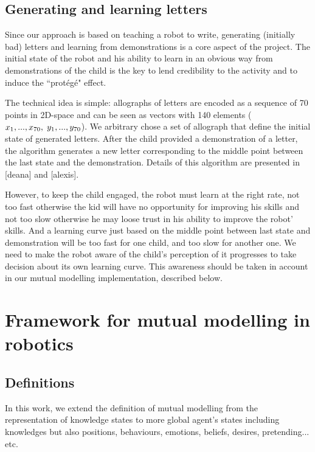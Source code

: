 \documentclass[10pt,a4paper,twocolumn]{article}
\begin{document}
\subsection{Generating and learning letters}

Since our approach is based on teaching a robot to write, generating (initially
bad) letters and learning from demonstrations is a core aspect of the project.
The initial state of the robot and his ability to learn in an obvious way
from demonstrations of the child is the key to lend credibility to the activity and to induce the ``prot\'eg\'e" effect.

The technical idea is simple: allographs of letters are encoded as a sequence of 70 points in
2D-space and can be seen as vectors with 140 elements
($x_1,...,x_{70},\hspace{1mm}y_1,...,y_{70}$). We arbitrary chose a set of allograph
that define the initial state of generated letters. 
After the child provided a demonstration of a letter, the algorithm
generates a new letter corresponding to the middle point between the last state and the
demonstration. Details of this algorithm are presented in [deana] and [alexis].

However, to keep the child engaged, the robot must learn at the right rate, not too fast otherwise the kid will have
no opportunity for improving his skills and not too slow otherwise he may loose
trust in his ability to improve the robot' skills. And a learning curve just based on the middle point between last state and demonstration will be too fast for one child, and too slow for another one. We need to make the robot aware of the child's perception of it progresses to take decision about its own learning curve. This awareness should be taken in account in our mutual modelling implementation, described below. 


\section{Framework for mutual modelling in robotics}

\subsection{Definitions}
In this work, we extend the definition of mutual modelling from the representation of knowledge states to more global agent's states including knowledges but also positions, behaviours, emotions, beliefs, desires, pretending... etc. 
\end{document}
